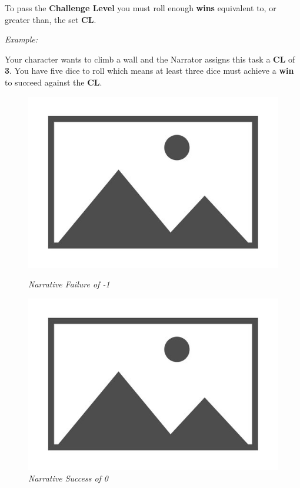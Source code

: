 To pass the \textbf{Challenge Level} you must roll enough \textbf{wins} equivalent to, or greater than, the set \textbf{CL}.

\textit{Example:}

\begin{displayquote}
    Your character wants to climb a wall and the Narrator assigns this task a \textbf{CL} of \textbf{3}. You have five dice to roll which means at least three dice must achieve a \textbf{win} to succeed against the \textbf{CL}.
\end{displayquote}


\begin{figure}[H]
    \centering
    \begin{minipage}[b]{0.4\textwidth}
        \includegraphics[width=\textwidth]{images/placeholder}
        \caption{\textit{Narrative Failure of -1}}
    \end{minipage}
    \hfill
    \begin{minipage}[b]{0.4\textwidth}
        \includegraphics[width=\textwidth]{images/placeholder}
        \caption{\textit{Narrative Success of 0}}
    \end{minipage}
\end{figure}

